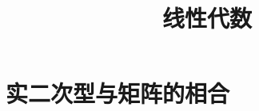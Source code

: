 \documentclass[aspectratio=169,handout]{ctexbeamer}
\title{线性代数}
\begin{document}
\setcounter{part}{4}
\part{实二次型与矩阵的相合}



\end{document}
